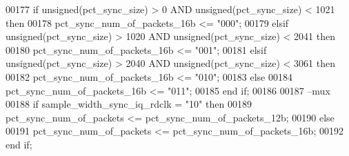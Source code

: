\begin{DoxyCode}
00177       \textcolor{keywordflow}{if} \textcolor{comment}{unsigned}\textcolor{vhdlchar}{(}\textcolor{vhdlchar}{pct_sync_size}\textcolor{vhdlchar}{)} \textcolor{vhdlchar}{>} \textcolor{vhdllogic}{}\textcolor{vhdllogic}{0} \textcolor{keywordflow}{AND} \textcolor{comment}{unsigned}\textcolor{vhdlchar}{(}\textcolor{vhdlchar}{pct_sync_size}\textcolor{vhdlchar}{)} \textcolor{vhdlchar}{<} \textcolor{vhdllogic}{}\textcolor{vhdllogic}{1021} \textcolor{keywordflow}{then}
00178          \textcolor{vhdlchar}{pct_sync_num_of_packets_16b} \textcolor{vhdlchar}{<=} \textcolor{vhdllogic}{"000"};
00179       \textcolor{keywordflow}{elsif} \textcolor{comment}{unsigned}\textcolor{vhdlchar}{(}\textcolor{vhdlchar}{pct_sync_size}\textcolor{vhdlchar}{)} \textcolor{vhdlchar}{>} \textcolor{vhdllogic}{}\textcolor{vhdllogic}{1020} \textcolor{keywordflow}{AND} \textcolor{comment}{unsigned}\textcolor{vhdlchar}{(}\textcolor{vhdlchar}{pct_sync_size}\textcolor{vhdlchar}{)} \textcolor{vhdlchar}{<} \textcolor{vhdllogic}{}\textcolor{vhdllogic}{2041} \textcolor{keywordflow}{then} 
00180          \textcolor{vhdlchar}{pct_sync_num_of_packets_16b} \textcolor{vhdlchar}{<=} \textcolor{vhdllogic}{"001"};
00181       \textcolor{keywordflow}{elsif} \textcolor{comment}{unsigned}\textcolor{vhdlchar}{(}\textcolor{vhdlchar}{pct_sync_size}\textcolor{vhdlchar}{)} \textcolor{vhdlchar}{>} \textcolor{vhdllogic}{}\textcolor{vhdllogic}{2040} \textcolor{keywordflow}{AND} \textcolor{comment}{unsigned}\textcolor{vhdlchar}{(}\textcolor{vhdlchar}{pct_sync_size}\textcolor{vhdlchar}{)} \textcolor{vhdlchar}{<} \textcolor{vhdllogic}{}\textcolor{vhdllogic}{3061} \textcolor{keywordflow}{then}
00182          \textcolor{vhdlchar}{pct_sync_num_of_packets_16b} \textcolor{vhdlchar}{<=} \textcolor{vhdllogic}{"010"};
00183       \textcolor{keywordflow}{else} 
00184          \textcolor{vhdlchar}{pct_sync_num_of_packets_16b} \textcolor{vhdlchar}{<=} \textcolor{vhdllogic}{"011"};         
00185       \textcolor{keywordflow}{end} \textcolor{keywordflow}{if};
00186            
00187 \textcolor{keyword}{      --mux}
00188       \textcolor{keywordflow}{if} \textcolor{vhdlchar}{sample_width_sync_iq_rdclk} \textcolor{vhdlchar}{=} \textcolor{vhdllogic}{"10"} \textcolor{keywordflow}{then} 
00189          \textcolor{vhdlchar}{pct_sync_num_of_packets} \textcolor{vhdlchar}{<=} \textcolor{vhdlchar}{pct_sync_num_of_packets_12b};
00190       \textcolor{keywordflow}{else} 
00191          \textcolor{vhdlchar}{pct_sync_num_of_packets} \textcolor{vhdlchar}{<=} \textcolor{vhdlchar}{pct_sync_num_of_packets_16b};
00192       \textcolor{keywordflow}{end} \textcolor{keywordflow}{if};

\end{DoxyCode}
